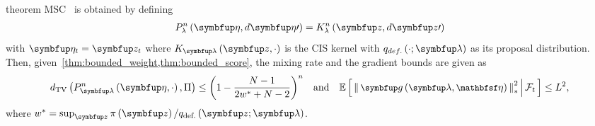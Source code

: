 
\begin{theoremEnd}{theorem}\label{thm:msc}
  MSC~\citep{NEURIPS2020_b2070693} is obtained by defining 
  {\small
  \begin{align*}
  P_{\lambda}^n\left(\veta, d\veta\prime\right)
  = 
  K_{\lambda}^n\left(\vz, d\vz\prime\right)
  \end{align*}
  }
  with  \(\veta_t = \vz_t\) where \(K_{\vlambda}\left(\vz, \cdot\right)\) is the CIS kernel with \(q_{def.}\left(\cdot; \vlambda\right)\) as its proposal distribution.
  Then, given~\cref{thm:bounded_weight,thm:bounded_score}, the mixing rate and the gradient bounds are given as
  {\small
  \begin{align*}
  \DTV{P_{\vlambda}^n\left(\veta, \cdot\right)}{\Pi} \leq  {\left(1 - \frac{N - 1}{2 w^* + N - 2}\right)}^n\quad \text{and}\quad
  {\small
  \E{ \norm{ \vg\left(\vlambda, \rvveta\right) }_{*}^2 \,\middle|\, \mathcal{F}_{t} } \leq  L^2,
  }
  \end{align*}
  }
  where \(w^* = \sup_{\vz} \pi\left(\vz\right) / q_{\text{def.}}\left(\vz;\vlambda\right)\).
\end{theoremEnd}
